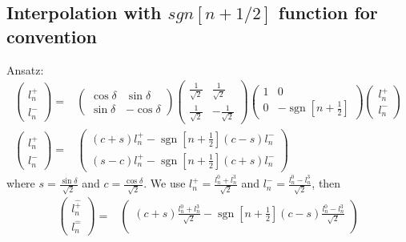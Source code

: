 \documentclass[]{article}
\numberwithin{equation}{section}
\DeclareMathOperator{\sgn}{sgn}
\begin{document}
{{\subsection{Interpolation with $sgn[n+1/2]$ function for convention}
Ansatz:
\begin{align}
    \begin{pmatrix}
        l^{\hat{+}}_n\\
        l^{\hat{-}}_n
    \end{pmatrix}=&\begin{pmatrix}
        \cos{\delta}&\sin{\delta}\\
        \sin{\delta}&-\cos{\delta}
    \end{pmatrix}\begin{pmatrix}
        \frac{1}{\sqrt{2}}&\frac{1}{\sqrt{2}}\\
        \frac{1}{\sqrt{2}}&-\frac{1}{\sqrt{2}}
    \end{pmatrix}\begin{pmatrix}
        1&0\\
        0&-\sgn\left[n+\frac{1}{2}\right]
    \end{pmatrix}\begin{pmatrix}
        l^{+}_n\\
        l^{-}_n
    \end{pmatrix}\\
    \begin{pmatrix}
        l^{\hat{+}}_n\\
        l^{\hat{-}}_n
    \end{pmatrix}=&\begin{pmatrix}
        (c+s)l^{+}_n-\sgn\left[n+\frac{1}{2}\right] (c-s)l^{-}_n\\
        (s-c)l^{+}_n-\sgn\left[n+\frac{1}{2}\right] (c+s)l^{-}_n
    \end{pmatrix}
\end{align}
where $s=\frac{\sin{\delta}}{\sqrt{2}}$ and $c=\frac{\cos{\delta}}{\sqrt{2}}$. We use $l^{+}_{n}=\frac{l^{0}_{n}+l^{3}_{n}}{\sqrt{2}}$ and $l^{-}_{n}=\frac{l^{0}_{n}-l^{3}_{n}}{\sqrt{2}}$, then
\begin{align}
    \begin{pmatrix}
        l^{\hat{+}}_n\\
        l^{\hat{-}}_n
    \end{pmatrix}=&\begin{pmatrix}
        (c+s)\frac{l^{0}_{n}+l^{3}_{n}}{\sqrt{2}}-\sgn\left[n+\frac{1}{2}\right] (c-s)\frac{l^{0}_{n}-l^{3}_{n}}{\sqrt{2}}\\

\end{pmatrix}
\end{align}}}
\end{document}
